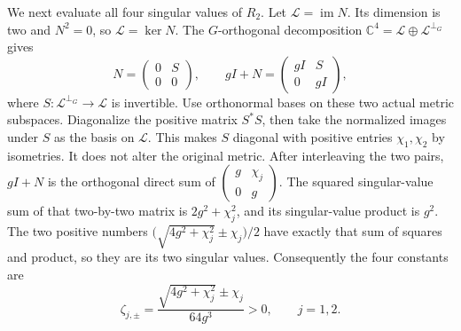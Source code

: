 \documentclass[11pt]{article}
\newcommand{\C}{\mathbb C}
\providecommand{\im}{\operatorname{im}}
\begin{document}
We next evaluate all four singular values of $R_2$.
Let $\mathcal L=\im N$. Its dimension is two and $N^2=0$,
so $\mathcal L=\ker N$. The $G$-orthogonal decomposition
$\C^4=\mathcal L\oplus\mathcal L^{\perp_G}$ gives
\begin{equation}
 N=\begin{pmatrix}0&S\\0&0\end{pmatrix},\qquad
 gI+N=\begin{pmatrix}gI&S\\0&gI\end{pmatrix},
 \tag{RS12}
\end{equation}
where $S:\mathcal L^{\perp_G}\to\mathcal L$ is invertible.
Use orthonormal bases on these two actual metric subspaces.
Diagonalize the positive matrix $S^*S$, then take the normalized
images under $S$ as the basis on $\mathcal L$. This makes $S$
diagonal with positive entries $\chi_1,\chi_2$ by isometries.
It does not alter the original metric. After interleaving the
two pairs, $gI+N$ is the orthogonal direct sum of
$\left(\begin{smallmatrix}g&\chi_j\\0&g\end{smallmatrix}\right)$.
The squared singular-value sum of that two-by-two matrix is
$2g^2+\chi_j^2$, and its singular-value product is $g^2$.
The two positive numbers
$\bigl(\sqrt{4g^2+\chi_j^2}\pm\chi_j\bigr)/2$
have exactly that sum of squares and product, so they are
its two singular values. Consequently the four constants are
\begin{equation}
 \zeta_{j,\pm}
 =\frac{\sqrt{4g^2+\chi_j^2}\pm\chi_j}{64g^3}>0,
 \qquad j=1,2.
 \tag{RS13}
\end{equation}
\end{document}

